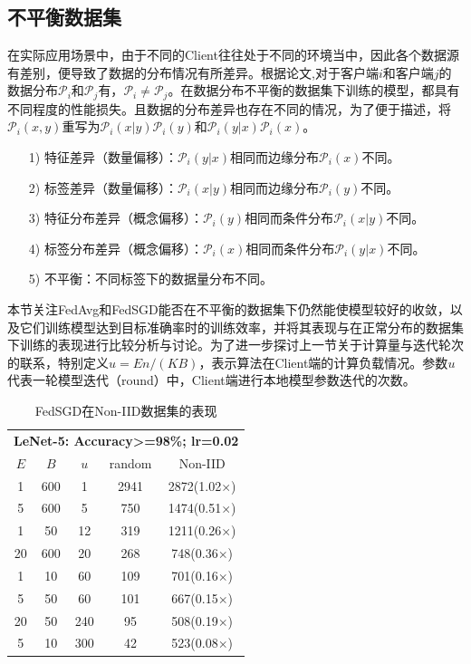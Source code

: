 \documentclass[zihao = -4,cn]{oucart}
\begin{document}
\subsection{不平衡数据集}
在实际应用场景中，由于不同的Client往往处于不同的环境当中，因此各个数据源有差别，便导致了数据的分布情况有所差异。根据论文\cite{hsieh2019non},对于客户端$i$和客户端$j$的数据分布$\mathcal{P}_i$和$\mathcal{P}_j$有，$\mathcal{P}_i \not= \mathcal{P}_j$。在数据分布不平衡的数据集下训练的模型，都具有不同程度的性能损失。且数据的分布差异也存在不同的情况，为了便于描述，将$\mathcal{P}_i(x,y)$重写为$\mathcal{P}_i(x|y)\mathcal{P}_i(y)$和$\mathcal{P}_i(y|x)\mathcal{P}_i(x)$。
\begin{itemize}
	\item [1)]
	特征差异（数量偏移）：$\mathcal{P}_i(y|x)$相同而边缘分布$\mathcal{P}_i(x)$不同。
	\item [2)]
	标签差异（数量偏移）：$\mathcal{P}_i(x|y)$相同而边缘分布$\mathcal{P}_i(y)$不同。
	\item [3)]
	特征分布差异（概念偏移）：$\mathcal{P}_i(y)$相同而条件分布$\mathcal{P}_i(x|y)$不同。
	\item [4)]
	标签分布差异（概念偏移）：$\mathcal{P}_i(x)$相同而条件分布$\mathcal{P}_i(y|x)$不同。
	\item [5)]
	不平衡：不同标签下的数据量分布不同。
\end{itemize}
\par
本节关注FedAvg和FedSGD能否在不平衡的数据集下仍然能使模型较好的收敛，以及它们训练模型达到目标准确率时的训练效率，并将其表现与在正常分布的数据集下训练的表现进行比较分析与讨论。为了进一步探讨上一节关于计算量与迭代轮次的联系，特别定义$u=En/(KB)$，表示算法在Client端的计算负载情况。参数$u$代表一轮模型迭代（round）中，Client端进行本地模型参数迭代的次数。

\begin{table}[!htbp]
\caption{\label{tab:sgdnoniid}FedSGD在Non-IID数据集的表现}
\begin{center}
\begin{tabular}{ccccc}
\toprule
 \multicolumn{5}{c}{\textbf{LeNet-5: Accuracy>=98\%; lr=0.02}} \\
$E$ & $B$ & $u$ & random & Non-IID \\
\midrule
1 & 600  & 1  & 2941  & 2872(1.02$\times$)\\
5 & 600  & 5  & 750  & 1474(0.51$\times$) \\
1 & 50  & 12 & 319  & 1211(0.26$\times$) \\
20 & 600 & 20 & 268 & 748(0.36$\times$) \\
1 & 10 & 60 & 109 & 701(0.16$\times$) \\
5 & 50 & 60 & 101 & 667(0.15$\times$) \\
20 & 50 & 240 & 95 & 508(0.19$\times$) \\
5 & 10 & 300 & 42 & 523(0.08$\times$) \\
\bottomrule
\end{tabular}
\end{center}
\end{table}
\end{document}

